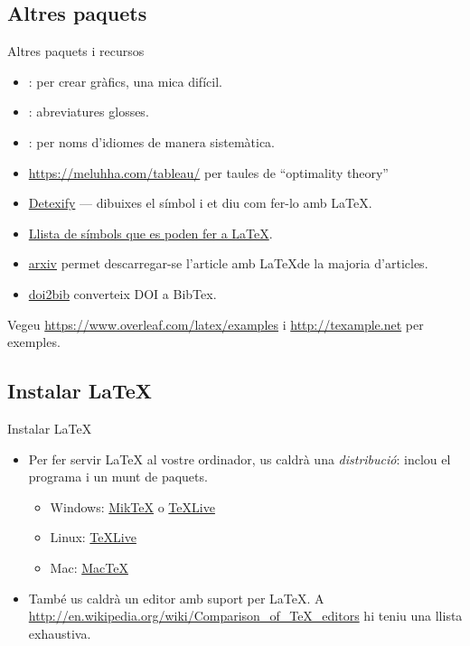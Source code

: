 \subsection{Altres paquets}
\begin{frame}{Altres paquets i recursos}
\begin{itemize}
    \item {}: per crear gràfics, una mica difícil.
    \item {}: abreviatures glosses. 
    \item {}: per noms d'idiomes de manera sistemàtica.
    \item \url{https://meluhha.com/tableau/} per taules de ``optimality theory''
    \item \href{https://detexify.kirelabs.org/classify.html}{Detexify} --- dibuixes el símbol i et diu com fer-lo amb \LaTeX.
    \item \href{https://tug.ctan.org/info/symbols/comprehensive/symbols-a4.pdf}{Llista de símbols que es poden fer a \LaTeX}.
    \item \href{https://arxiv.org}{arxiv} permet descarregar-se l'article amb \LaTeX de la majoria d'articles.
    \item \href{https://www.doi2bib.org/}{doi2bib} converteix DOI a BibTex.
\end{itemize}
Vegeu \url{https://www.overleaf.com/latex/examples} i \url{http://texample.net} 
per exemples.
\end{frame}

\subsection{Instalar \LaTeX{}}
\begin{frame}{Instalar \LaTeX}
\begin{itemize}
\item Per fer servir \LaTeX{} al vostre ordinador, us caldrà una \emph{distribució}:
    inclou el programa  i un munt de paquets.
\begin{itemize}
\item Windows: \href{http://miktex.org/}{Mik\TeX} o \href{http://tug.org/texlive/}{\TeX Live}
\item Linux: \href{http://tug.org/texlive/}{\TeX Live}
\item Mac: \href{http://tug.org/mactex/}{Mac\TeX}
\end{itemize}
\item També us caldrà un editor amb suport per \LaTeX{}. A \url{http://en.wikipedia.org/wiki/Comparison_of_TeX_editors} hi teniu una llista exhaustiva.
\end{itemize}
\end{frame}

